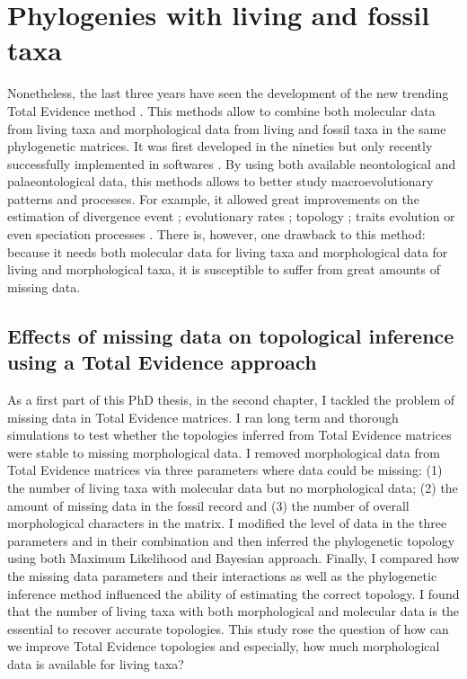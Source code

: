 \section{Phylogenies with living and fossil taxa}
Nonetheless, the last three years have seen the development of the new trending Total Evidence method \citep{ronquista2012,slaterphylogenetic2013,Wood01032013,schragocombining2013,beckancient2014,Arcila2015131,Dembo2015}.
This methods allow to combine both molecular data from living taxa and morphological data from living and fossil taxa in the same phylogenetic matrices.
It was first developed in the nineties \citep{eernissetaxonomic1993} but only recently successfully implemented in softwares \citep{Ronquist2012mrbayes,BEAST2}.
By using both available neontological and palaeontological data, this methods allows to better study macroevolutionary patterns and processes.
For example, it allowed great improvements on the estimation of divergence event \citep[e.g.][]{ronquista2012}; evolutionary rates \citep[e.g.][]{beckancient2014}; topology \citep[e.g.][]{Dembo2015}; traits evolution \citep[e.g.][]{slaterphylogenetic2013} or even speciation processes \citep[e.g.][]{Wood01032013}.
There is, however, one drawback to this method: because it needs both molecular data for living taxa and morphological data for living and morphological taxa, it is susceptible to suffer from great amounts of missing data.

\subsection{Effects of missing data on topological inference using a Total Evidence approach}
As a first part of this PhD thesis, in the second chapter, I tackled the problem of missing data in Total Evidence matrices.
I ran long term and thorough simulations to test whether the topologies inferred from Total Evidence matrices were stable to missing morphological data.
I removed morphological data from Total Evidence matrices via three parameters where data could be missing: (1) the number of living taxa with molecular data but no morphological data; (2) the amount of missing data in the fossil record and (3) the number of overall morphological characters in the matrix.
I modified the level of data in the three parameters and in their combination and then inferred the phylogenetic topology using both Maximum Likelihood and Bayesian approach.
Finally, I compared how the missing data parameters and their interactions as well as the phylogenetic inference method influenced the ability of estimating the correct topology.
I found that the number of living taxa with both morphological and molecular data is the essential to recover accurate topologies.
This study rose the question of how can we improve Total Evidence topologies and especially, how much morphological data is available for living taxa?

